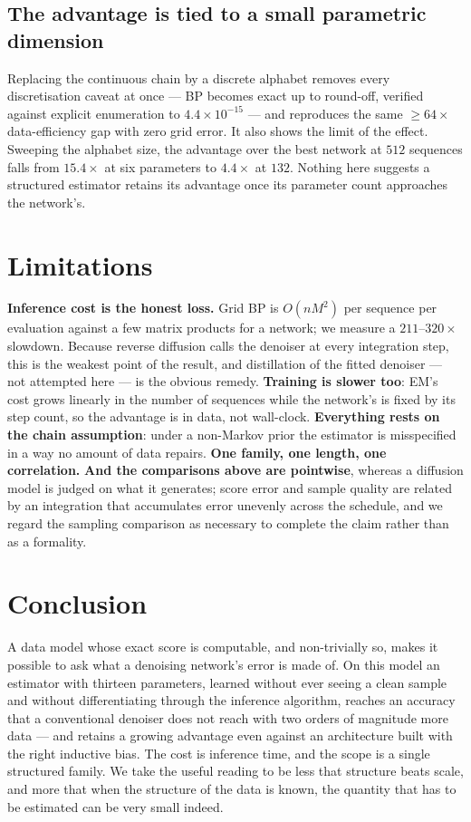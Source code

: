 \documentclass{article}
\begin{document}
\subsection{The advantage is tied to a small parametric dimension}

Replacing the continuous chain by a discrete alphabet removes every discretisation caveat at
once --- BP becomes exact up to round-off, verified against explicit enumeration to
$4.4\times10^{-15}$ --- and reproduces the same $\ge 64\times$ data-efficiency gap with zero
grid error. It also shows the limit of the effect. Sweeping the alphabet size, the advantage
over the best network at $512$ sequences falls from $15.4\times$ at six parameters to
$4.4\times$ at $132$. Nothing here suggests a structured estimator retains its advantage once
its parameter count approaches the network's.

\section{Limitations}

\textbf{Inference cost is the honest loss.} Grid BP is $O(nM^2)$ per sequence per evaluation
against a few matrix products for a network; we measure a $211$--$320\times$ slowdown.
Because reverse diffusion calls the denoiser at every integration step, this is the weakest
point of the result, and distillation of the fitted denoiser --- not attempted here --- is
the obvious remedy. \textbf{Training is slower too}: EM's cost grows linearly in the number
of sequences while the network's is fixed by its step count, so the advantage is in data, not
wall-clock. \textbf{Everything rests on the chain assumption}: under a non-Markov prior the
estimator is misspecified in a way no amount of data repairs. \textbf{One family, one length,
one correlation.} \textbf{And the comparisons above are pointwise}, whereas a diffusion model
is judged on what it generates; score error and sample quality are related by an integration
that accumulates error unevenly across the schedule, and we regard the sampling comparison as
necessary to complete the claim rather than as a formality.

\section{Conclusion}

A data model whose exact score is computable, and non-trivially so, makes it possible to ask
what a denoising network's error is made of. On this model an estimator with thirteen
parameters, learned without ever seeing a clean sample and without differentiating through
the inference algorithm, reaches an accuracy that a conventional denoiser does not reach with
two orders of magnitude more data --- and retains a growing advantage even against an
architecture built with the right inductive bias. The cost is inference time, and the scope
is a single structured family. We take the useful reading to be less that structure beats
scale, and more that when the structure of the data is known, the quantity that has to be
estimated can be very small indeed.
\end{document}
